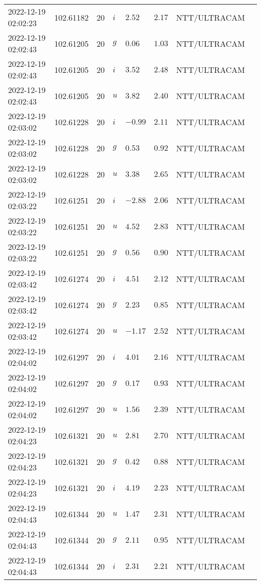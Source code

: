 \documentclass{nature_plusfigure}
\begin{document}
\begin{supplement}
\begin{center}
\begin{longtable}{llllllll}
2022-12-19 02:02:23 & 102.61182 & 20 & $i$ & $2.52$ & $2.17$ & NTT/ULTRACAM &  \\ 
2022-12-19 02:02:43 & 102.61205 & 20 & $g$ & $0.06$ & $1.03$ & NTT/ULTRACAM &  \\ 
2022-12-19 02:02:43 & 102.61205 & 20 & $i$ & $3.52$ & $2.48$ & NTT/ULTRACAM &  \\ 
2022-12-19 02:02:43 & 102.61205 & 20 & $u$ & $3.82$ & $2.40$ & NTT/ULTRACAM &  \\ 
2022-12-19 02:03:02 & 102.61228 & 20 & $i$ & $-0.99$ & $2.11$ & NTT/ULTRACAM &  \\ 
2022-12-19 02:03:02 & 102.61228 & 20 & $g$ & $0.53$ & $0.92$ & NTT/ULTRACAM &  \\ 
2022-12-19 02:03:02 & 102.61228 & 20 & $u$ & $3.38$ & $2.65$ & NTT/ULTRACAM &  \\ 
2022-12-19 02:03:22 & 102.61251 & 20 & $i$ & $-2.88$ & $2.06$ & NTT/ULTRACAM &  \\ 
2022-12-19 02:03:22 & 102.61251 & 20 & $u$ & $4.52$ & $2.83$ & NTT/ULTRACAM &  \\ 
2022-12-19 02:03:22 & 102.61251 & 20 & $g$ & $0.56$ & $0.90$ & NTT/ULTRACAM &  \\ 
2022-12-19 02:03:42 & 102.61274 & 20 & $i$ & $4.51$ & $2.12$ & NTT/ULTRACAM &  \\ 
2022-12-19 02:03:42 & 102.61274 & 20 & $g$ & $2.23$ & $0.85$ & NTT/ULTRACAM &  \\ 
2022-12-19 02:03:42 & 102.61274 & 20 & $u$ & $-1.17$ & $2.52$ & NTT/ULTRACAM &  \\ 
2022-12-19 02:04:02 & 102.61297 & 20 & $i$ & $4.01$ & $2.16$ & NTT/ULTRACAM &  \\ 
2022-12-19 02:04:02 & 102.61297 & 20 & $g$ & $0.17$ & $0.93$ & NTT/ULTRACAM &  \\ 
2022-12-19 02:04:02 & 102.61297 & 20 & $u$ & $1.56$ & $2.39$ & NTT/ULTRACAM &  \\ 
2022-12-19 02:04:23 & 102.61321 & 20 & $u$ & $2.81$ & $2.70$ & NTT/ULTRACAM &  \\ 
2022-12-19 02:04:23 & 102.61321 & 20 & $g$ & $0.42$ & $0.88$ & NTT/ULTRACAM &  \\ 
2022-12-19 02:04:23 & 102.61321 & 20 & $i$ & $4.19$ & $2.23$ & NTT/ULTRACAM &  \\ 
2022-12-19 02:04:43 & 102.61344 & 20 & $u$ & $1.47$ & $2.31$ & NTT/ULTRACAM &  \\ 
2022-12-19 02:04:43 & 102.61344 & 20 & $g$ & $2.11$ & $0.95$ & NTT/ULTRACAM &  \\ 
2022-12-19 02:04:43 & 102.61344 & 20 & $i$ & $2.31$ & $2.21$ & NTT/ULTRACAM &  \\ 

\end{longtable}
\end{center}
\end{supplement}
\end{document}
